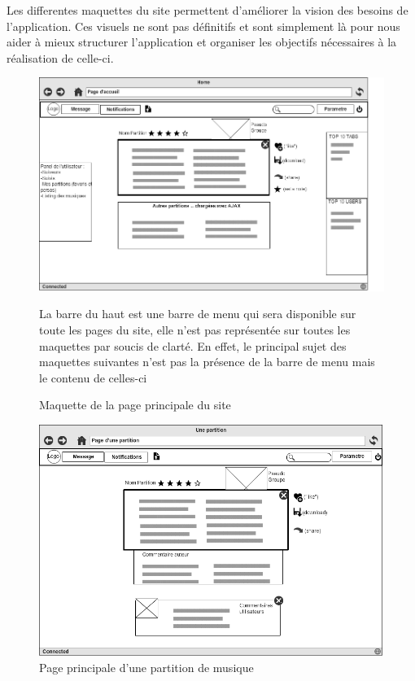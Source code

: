 Les differentes maquettes du site permettent d'améliorer la vision des besoins de l'application.
Ces visuels ne sont pas définitifs et sont simplement là pour nous aider à mieux structurer l'application et organiser les objectifs nécessaires à la réalisation de celle-ci.
\begin{figure}[H]

\centering
\includegraphics[scale=0.5]{Home}
\caption{Maquette de la page principale du site}
La barre du haut est une barre de menu qui sera
disponible sur toute les pages du site, elle n'est pas
représentée sur toutes les maquettes par soucis de clarté. En
effet, le principal sujet des maquettes suivantes n'est pas
la présence de la barre de menu mais le contenu de celles-ci
\end{figure}

\begin{figure}[H]

\centering
\includegraphics[scale=0.5]{Tab}
\caption{Page principale d'une partition de musique}
\end{figure}


